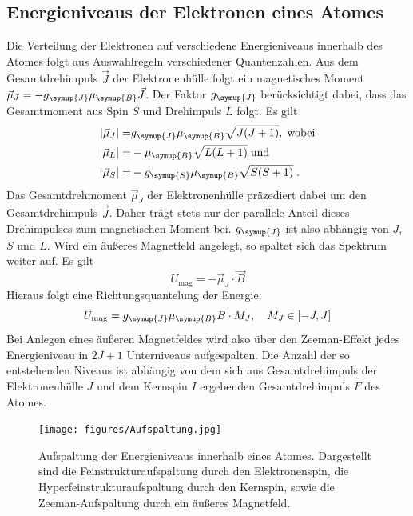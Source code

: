 \subsection{Energieniveaus der Elektronen eines Atomes}
%
Die Verteilung der Elektronen auf verschiedene Energieniveaus innerhalb des
Atomes folgt aus Auswahlregeln verschiedener Quantenzahlen. Aus dem
Gesamtdrehimpuls $\vec{J}$ der Elektronenhülle folgt ein magnetisches Moment
$\vec{\mu}_J=-g_{\symup{J}}\mu_{\symup{B}}\vec{J}$. Der Faktor $g_{\symup{J}}$
berücksichtigt dabei, dass das Gesamtmoment aus Spin $S$ und Drehimpuls $L$
folgt. Es gilt
%
\begin{align*}
  |\vec{\mu}_J|=&g_{\symup{J}}\mu_{\symup{B}}\sqrt{J(J+1)},\;\text{wobei} \\
  |\vec{\mu}_L|=&-\mu_{\symup{B}}\sqrt{L(L+1)}\;\text{und} \\
  |\vec{\mu}_S|=&-g_{\symup{S}}\mu_{\symup{B}}\sqrt{S(S+1)}\;.
\end{align*}
%
Das Gesamtdrehmoment $\vec{\mu}_J$ der Elektronenhülle präzediert dabei um den
Gesamtdrehimpuls $\vec{J}$. Daher trägt stets nur der parallele Anteil dieses
Drehimpulses zum magnetischen Moment bei. $g_{\symup{J}}$ ist also abhängig von
$J$, $S$ und $L$. Wird ein äußeres Magnetfeld angelegt, so spaltet sich das
Spektrum weiter auf. Es gilt
%
\begin{equation}
  U_\text{mag}=-\vec{\mu}_J\cdot\vec{B}
\end{equation}
%
Hieraus folgt eine Richtungsquantelung der Energie:
%
\begin{equation}
  U_\text{mag}=g_{\symup{J}}\mu_{\symup{B}}B\cdot M_J,\quad M_J\in[-J,J]
\end{equation}
%
Bei Anlegen eines äußeren Magnetfeldes wird also über den Zeeman-Effekt jedes
Energieniveau in $2J+1$ Unterniveaus aufgespalten. Die Anzahl der so
entstehenden Niveaus ist abhängig von dem sich aus Gesamtdrehimpuls der
Elektronenhülle $J$ und dem Kernspin $I$ ergebenden Gesamtdrehimpuls $F$ des
Atomes.
%
\begin{figure}[htb]
  \centering
  \texttt{[image: figures/Aufspaltung.jpg]}
  \caption{Aufspaltung der Energieniveaus innerhalb eines Atomes. Dargestellt
  sind die Feinstrukturaufspaltung durch den Elektronenspin, die
  Hyperfeinstrukturaufspaltung durch den Kernspin, sowie die Zeeman-Aufspaltung
  durch ein äußeres Magnetfeld.}
  \label{fig:aufspaltung}
\end{figure}

